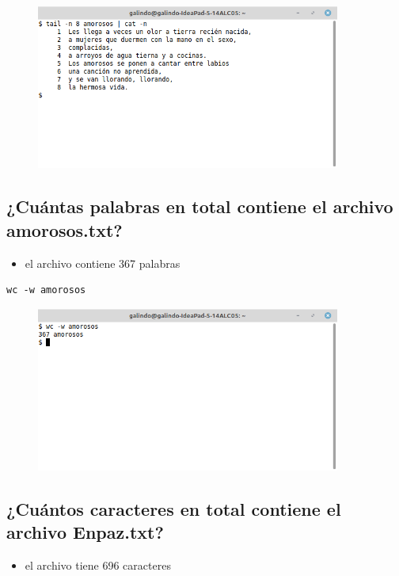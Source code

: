\documentclass[11pt]{article}
\begin{document}
\begin{figure}[htbp]
\centering
\includegraphics[width=10cm]{img/a14.png}
\caption{}
\end{figure}

\pagebreak

\subsection{¿Cuántas palabras en total contiene el archivo amorosos.txt?}
\label{sec:org5feb86a}
\begin{itemize}
\item el archivo contiene 367 palabras
\end{itemize}

\begin{verbatim}
wc -w amorosos        
\end{verbatim}

\begin{figure}[htbp]
\centering
\includegraphics[width=10cm]{img/a15.png}
\caption{}
\end{figure}

\cite{linux_wc}

\subsection{¿Cuántos caracteres en total contiene el archivo Enpaz.txt?}
\label{sec:orgf463ff4}

\begin{itemize}
\item el archivo tiene 696 caracteres
\end{itemize}
\end{document}
